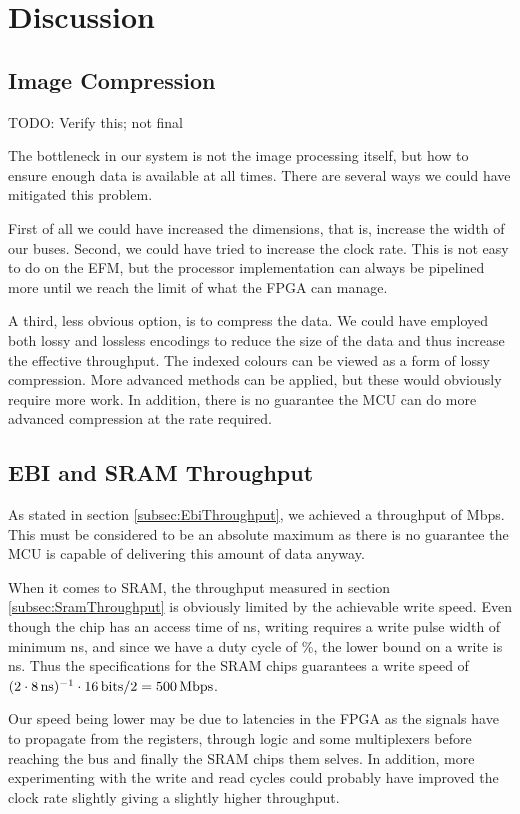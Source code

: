 \section{Discussion}

\subsection{Image Compression}
TODO: Verify this; not final

The bottleneck in our system is not the image processing itself, but how to ensure enough data is available at all times.
There are several ways we could have mitigated this problem.

First of all we could have increased the dimensions, that is, increase the width of our buses. Second, we could have tried to increase the clock rate. This is not easy to do on the EFM, but the processor implementation can always be pipelined more until we reach the limit of what the FPGA can manage.

A third, less obvious option, is to compress the data. We could have employed both lossy and lossless encodings to reduce the size of the data and thus increase the effective throughput. The indexed colours can be viewed as a form of lossy compression.
More advanced methods can be applied, but these would obviously require more work.
In addition, there is no guarantee the MCU can do more advanced compression at the rate required.

\subsection{EBI and SRAM Throughput}
As stated in section \ref{subsec:EbiThroughput}, we achieved a throughput of \unit[384]{Mbps}.
This must be considered to be an absolute maximum as there is no guarantee the MCU is capable of delivering this amount of data anyway.

When it comes to SRAM, the throughput measured in section \ref{subsec:SramThroughput} is obviously limited by the achievable write speed.
Even though the chip has an access time of \unit[10]{ns}, writing requires a write pulse width of minimum \unit[8]{ns}, and since we have a duty cycle of \unit[50]{\%}, the lower bound on a write is \unit[16]{ns}.
Thus the specifications for the SRAM chips guarantees a write speed of $(2\cdot\unit[8]{ns})^{-1} \cdot \unit[16]{bits} / 2 = \unit[500]{Mbps}$.

Our speed being lower may be due to latencies in the FPGA as the signals have to propagate from the registers, through logic and some multiplexers before reaching the bus and finally the SRAM chips them selves. In addition, more experimenting with the write and read cycles could probably have improved the clock rate slightly giving a slightly higher throughput.
